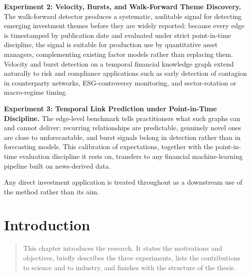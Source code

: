 \documentclass[a4paper,12pt]{report}
\newenvironment{microabstract}{\begin{quotation}\noindent}{\end{quotation}}
\begin{document}
\textbf{Experiment 2: Velocity, Bursts, and Walk-Forward Theme Discovery.}
The walk-forward detector
produces a systematic, auditable signal for detecting emerging
investment themes before they are widely reported: because every edge is
timestamped by publication date and evaluated under strict point-in-time
discipline, the signal is suitable for production use by quantitative
asset managers, complementing existing factor models rather than
replacing them. Velocity and burst detection on a temporal financial
knowledge graph extend naturally to risk and compliance applications
such as early detection of contagion in counterparty networks,
ESG-controversy monitoring, and sector-rotation or macro-regime timing.

\textbf{Experiment 3: Temporal Link Prediction under Point-in-Time
Discipline.} The edge-level benchmark tells
practitioners what such graphs can and cannot deliver: recurring
relationships are predictable, genuinely novel ones are close to
unforecastable, and burst signals belong in detection rather than in
forecasting models. This calibration of expectations, together with the
point-in-time evaluation discipline it rests on, transfers to any
financial machine-learning pipeline built on news-derived data.

Any direct investment application is treated throughout as a downstream
use of the method rather than its aim.

\tableofcontents
\listoffigures
\listoftables

\cleardoublepage
{}
\setcounter{page}{1}

\chapter{Introduction}
\begin{microabstract}
This chapter introduces the research. It states the motivations and
objectives, briefly describes the three experiments, lists the
contributions to science and to industry, and finishes with the
structure of the thesis.
\end{microabstract}
\end{document}
